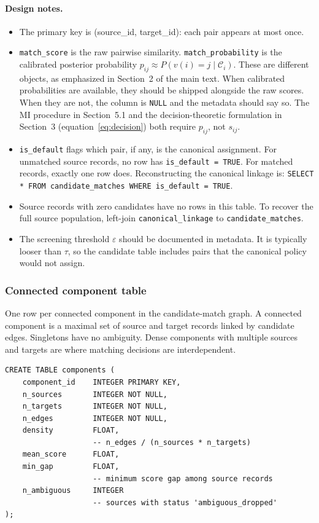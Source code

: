 \paragraph{Design notes.}
\begin{itemize}
    \item The primary key is (source\_id, target\_id): each pair appears at most once.
    \item \texttt{match\_score} is the raw pairwise similarity. \texttt{match\_probability} is the calibrated posterior probability $p_{ij} \approx P(v(i) = j \mid \mathcal{C}_i)$. These are different objects, as emphasized in Section~2 of the main text. When calibrated probabilities are available, they should be shipped alongside the raw scores. When they are not, the column is \texttt{NULL} and the metadata should say so. The MI procedure in Section~5.1 and the decision-theoretic formulation in Section~3 (equation~\ref{eq:decision}) both require $p_{ij}$, not $s_{ij}$.
    \item \texttt{is\_default} flags which pair, if any, is the canonical assignment. For unmatched source records, no row has \texttt{is\_default = TRUE}. For matched records, exactly one row does. Reconstructing the canonical linkage is: \texttt{SELECT * FROM candidate\_matches WHERE is\_default = TRUE}.
    \item Source records with zero candidates have no rows in this table. To recover the full source population, left-join \texttt{canonical\_linkage} to \texttt{candidate\_matches}.
    \item The screening threshold $\varepsilon$ should be documented in metadata. It is typically looser than $\tau$, so the candidate table includes pairs that the canonical policy would not assign.
\end{itemize}

\subsubsection{Connected component table}
\label{sec:components}

One row per connected component in the candidate-match graph. A connected component is a maximal set of source and target records linked by candidate edges. Singletons have no ambiguity. Dense components with multiple sources and targets are where matching decisions are interdependent.

\begin{lstlisting}[style=sql]
CREATE TABLE components (
    component_id    INTEGER PRIMARY KEY,
    n_sources       INTEGER NOT NULL,
    n_targets       INTEGER NOT NULL,
    n_edges         INTEGER NOT NULL,
    density         FLOAT,
                    -- n_edges / (n_sources * n_targets)
    mean_score      FLOAT,
    min_gap         FLOAT,
                    -- minimum score gap among source records
    n_ambiguous     INTEGER
                    -- sources with status 'ambiguous_dropped'
);
\end{lstlisting}

